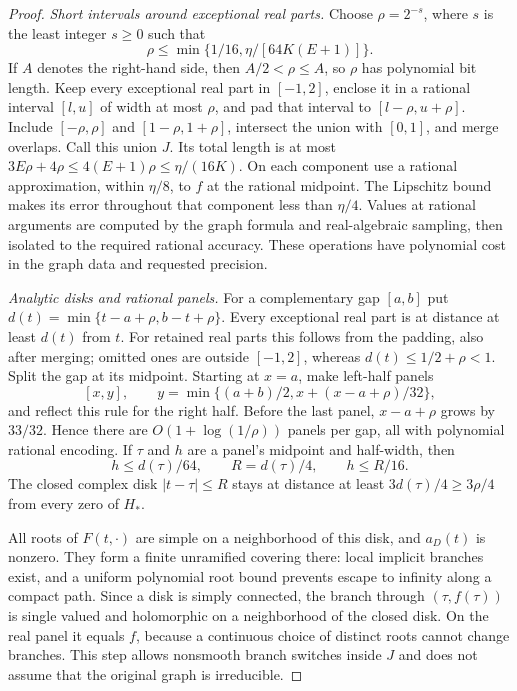 \begin{proof}
\emph{Short intervals around exceptional real parts.}
Choose $\rho=2^{-s}$, where $s$ is the least integer $s\ge0$ such that
\[
 \rho\le\min\{1/16,\eta/[64K(E+1)]\}.
\]
If $A$ denotes the right-hand side, then $A/2<\rho\le A$, so $\rho$ has
polynomial bit length.
Keep every exceptional real part in $[-1,2]$,
enclose it in a rational interval $[l,u]$ of width at most $\rho$, and
pad that interval to $[l-\rho,u+\rho]$. Include $[-\rho,\rho]$ and
$[1-\rho,1+\rho]$, intersect the union with $[0,1]$, and merge overlaps.
Call this union $J$. Its total length is at most
$3E\rho+4\rho\le4(E+1)\rho\le\eta/(16K)$.
On each component use a rational approximation, within $\eta/8$, to
$f$ at the rational midpoint. The Lipschitz bound makes its error
throughout that component less than $\eta/4$. Values at rational
arguments are computed by the graph formula and real-algebraic sampling,
then isolated to the required rational accuracy. These operations have
polynomial cost in the graph data and requested precision.

\emph{Analytic disks and rational panels.}
For a complementary gap $[a,b]$ put
$d(t)=\min\{t-a+\rho,b-t+\rho\}$.
Every exceptional real part is at distance at least $d(t)$ from $t$.
For retained real parts this follows from the padding, also after merging;
omitted ones are outside $[-1,2]$, whereas $d(t)\le1/2+\rho<1$.
Split the gap at its midpoint. Starting at $x=a$, make left-half panels
\[
 [x,y],\qquad y=\min\{(a+b)/2,x+(x-a+\rho)/32\},
\]
and reflect this rule for the right half. Before the last panel,
$x-a+\rho$ grows by $33/32$. Hence there are
$O(1+\log(1/\rho))$ panels per gap, all with polynomial rational encoding.
If $\tau$ and $h$ are a panel's midpoint and half-width, then
\[
 h\le d(\tau)/64,
 \qquad R=d(\tau)/4,
 \qquad h\le R/16.
\]
The closed complex disk $|t-\tau|\le R$ stays at distance at least
$3d(\tau)/4\ge3\rho/4$ from every zero of $H_*$.

All roots of $F(t,\cdot)$ are simple on a neighborhood of this disk,
and $a_D(t)$ is nonzero. They form a finite unramified covering there:
local implicit branches exist, and a uniform polynomial root bound
prevents escape to infinity along a compact path. Since a disk is simply
connected, the branch through $(\tau,f(\tau))$ is single valued and
holomorphic on a neighborhood of the closed disk. On the real panel it
equals $f$, because a continuous choice of distinct roots cannot change
branches. This step allows nonsmooth branch switches inside $J$ and
does not assume that the original graph is irreducible.


\end{proof}
